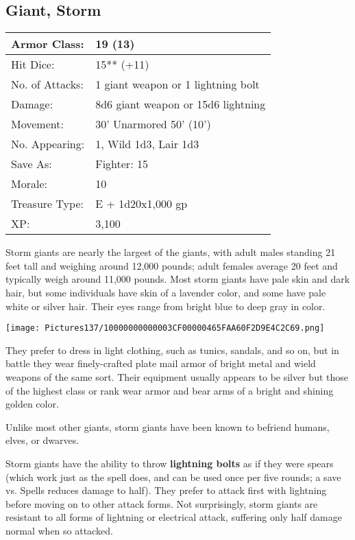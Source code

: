 \documentclass[a4paper,twoside,openany,10pt]{book}
\begin{document}
\begin{multicols}{2}
\subsection*{Giant, Storm}\label{giant-storm}

\begin{tabularx}{0.48\textwidth}{@{}lX@{}}
Armor Class: & 19 (13) \\\hline
Hit Dice: & 15** (+11) \\\hline
No. of Attacks: & 1 giant weapon or 1 lightning bolt \\\hline
Damage: & 8d6 giant weapon or 15d6 lightning \\\hline
Movement: & 30' Unarmored 50'
(10') \\\hline
No. Appearing: & 1, Wild 1d3, Lair 1d3 \\\hline
Save As: & Fighter: 15 \\\hline
Morale: & 10 \\\hline
Treasure Type: & E + 1d20x1,000 gp \\\hline
XP: & 3,100 \\\hline
\end{tabularx}\medskip

Storm giants are nearly the largest of the giants, with adult males standing 21 feet tall and weighing around 12,000 pounds; adult females average 20 feet and typically weigh around 11,000 pounds. Most storm giants have pale skin and dark hair, but some individuals have skin of a lavender color, and some have pale white or silver hair. Their eyes range from bright blue to deep gray in color.

\begin{center}
	\texttt{[image: Pictures137/10000000000003CF00000465FAA60F2D9E4C2C69.png]}
\end{center}

They prefer to dress in light clothing, such as tunics, sandals, and so on, but in battle they wear finely-crafted plate mail armor of bright metal and wield weapons of the same sort. Their equipment usually appears to be silver but those of the highest class or rank wear armor and bear arms of a bright and shining golden color.

Unlike most other giants, storm giants have been known to befriend humans, elves, or dwarves.

Storm giants have the ability to throw \textbf{lightning bolts} as if they were spears (which work just as the spell does, and can be used once per five rounds; a save vs. Spells reduces damage to half). They prefer to attack first with lightning before moving on to other attack forms. Not surprisingly, storm giants are resistant to all forms of lightning or electrical attack, suffering only half damage normal when so attacked.


\end{multicols}
\end{document}
